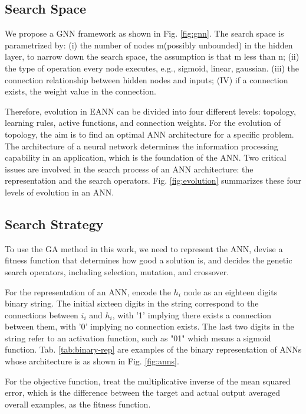 \subsection{Search Space}
We propose a GNN framework as shown in Fig. \ref{fig:gnn}. The search space
is parametrized by: (i) the number of nodes m(possibly unbounded) in the hidden
layer, to narrow down the search space, the assumption is that m less than n; (ii) the type of
operation every node executes, e.g., sigmoid, linear, gaussian. (iii) the
connection relationship between hidden nodes and inputs; (IV) if a connection
exists, the weight value in the connection.

Therefore, evolution in EANN can be divided into four different levels:
topology, learning rules, active functions, and connection weights. For the
evolution of topology, the aim is to find an optimal ANN architecture for a
specific problem. The architecture of a neural network determines the
information processing capability in an application, which is the foundation of
the ANN. Two critical issues are involved in the search process of an ANN
architecture: the representation and the search operators.
Fig. \ref{fig:evolution} summarizes these four levels of evolution in
an ANN.



\subsection{Search Strategy}
To use the GA method in this work, we need to represent the ANN, devise a
fitness function that determines how good a solution is, and decides the
genetic search operators, including selection, mutation, and crossover.

For the representation of an ANN, encode the $h_i$ node as an eighteen digits
binary string. The initial sixteen digits in the string correspond to the
connections between $i_i$ and $h_i$, with '1' implying there exists a
connection between them, with '0' implying no connection exists. The last two
digits in the string refer to an activation function, such as "01" which means a
sigmoid function. Tab. \ref{tab:binary-rep} are examples of the binary
representation of ANNs whose architecture is as shown in
Fig. \ref{fig:anns}. 

For the objective function, treat the multiplicative inverse of the mean
squared error, which is the difference between the target and actual output
averaged overall examples, as the fitness function.

